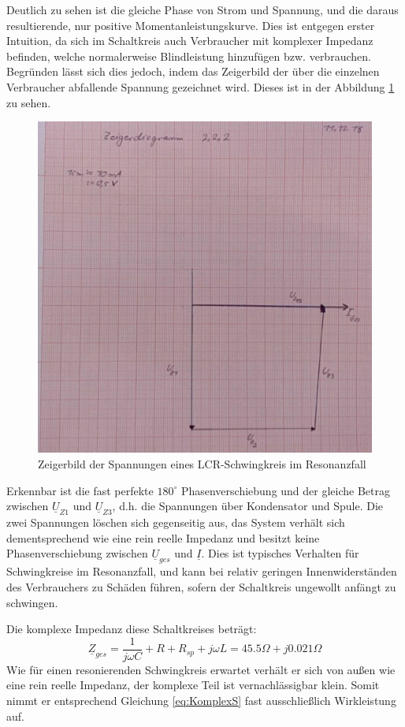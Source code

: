 Deutlich zu sehen ist die gleiche Phase von Strom und Spannung, und die daraus resultierende, nur positive Momentanleistungskurve. Dies ist entgegen erster Intuition, da sich im Schaltkreis auch Verbraucher mit komplexer Impedanz befinden, welche normalerweise Blindleistung hinzufügen bzw. verbrauchen.
Begründen lässt sich dies jedoch, indem das Zeigerbild der über die einzelnen Verbraucher abfallende Spannung gezeichnet wird. Dieses ist in der Abbildung \ref{fig:ZeigerbildResonanz} zu sehen.

\begin{figure}[H]
\centering
\includegraphics[width=0.7\linewidth]{Images/Zeigerdiagramm2-2-2.jpg}
\caption{Zeigerbild der Spannungen eines LCR-Schwingkreis im Resonanzfall}
\label{fig:ZeigerbildResonanz}
\end{figure}

Erkennbar ist die fast perfekte $180^\circ$ Phasenverschiebung und der gleiche Betrag zwischen $\underline{U}_{Z1}$ und $\underline{U}_{Z3}$, d.h. die Spannungen über Kondensator und Spule. Die zwei Spannungen löschen sich gegenseitig aus, das System verhält sich dementsprechend wie eine rein reelle Impedanz und besitzt keine Phasenverschiebung zwischen $\underline{U}_{ges}$ und $\underline{I}$. Dies ist typisches Verhalten für Schwingkreise im Resonanzfall, und kann bei relativ geringen Innenwiderständen des Verbrauchers zu Schäden führen, sofern der Schaltkreis ungewollt anfängt zu schwingen.

Die komplexe Impedanz diese Schaltkreises beträgt:
\begin{equation*}
\underline{Z}_{ges} = \frac{1}{j\omega C} + R + R_{sp} + j\omega L = 45.5\Omega + j0.021\Omega
\end{equation*}
Wie für einen resonierenden Schwingkreis erwartet verhält er sich von außen wie eine rein reelle Impedanz, der komplexe Teil ist vernachlässigbar klein. Somit nimmt er entsprechend Gleichung \eqref{eq:KomplexS} fast ausschließlich Wirkleistung auf.
